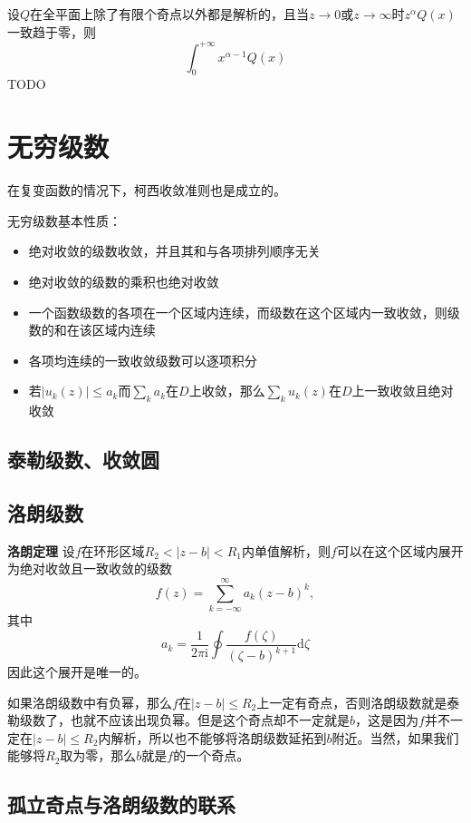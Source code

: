 \documentclass[UTF8]{ctexart}
\begin{document}
设$Q$在全平面上除了有限个奇点以外都是解析的，且当$z \to 0$或$z \to \infty$时$z^\alpha Q(x)$一致趋于零，则
\[
\int_0^{+\infty} x^{\alpha - 1} Q(x)
\] TODO

\hypertarget{ux65e0ux7a77ux7ea7ux6570}{%
\section{无穷级数}\label{ux65e0ux7a77ux7ea7ux6570}}

在复变函数的情况下，柯西收敛准则也是成立的。

无穷级数基本性质：
\begin{itemize}
    \item 绝对收敛的级数收敛，并且其和与各项排列顺序无关
    \item 绝对收敛的级数的乘积也绝对收敛
    \item 一个函数级数的各项在一个区域内连续，而级数在这个区域内一致收敛，则级数的和在该区域内连续
    \item 各项均连续的一致收敛级数可以逐项积分 
    \item 若$|u_k(z)| \leq a_k$而$\sum_k a_k$在$D$上收敛，那么$\sum_k u_k(z)$在$D$上一致收敛且绝对收敛
\end{itemize}

\hypertarget{ux6cf0ux52d2ux7ea7ux6570ux6536ux655bux5706}{%
\subsection{泰勒级数、收敛圆}\label{ux6cf0ux52d2ux7ea7ux6570ux6536ux655bux5706}}

\hypertarget{ux6d1bux6717ux7ea7ux6570}{%
\subsection{洛朗级数}\label{ux6d1bux6717ux7ea7ux6570}}

\textbf{洛朗定理}
设$f$在环形区域$R_2 < |z-b| < R_1$内单值解析，则$f$可以在这个区域内展开为绝对收敛且一致收敛的级数
\[
f(z) = \sum_{k=-\infty}^\infty a_k (z-b)^k,
\] 其中 \[
a_k = \frac{1}{2\pi \mathrm{i}} \oint \frac{f(\zeta)}{(\zeta - b)^{k+1}}\mathrm{d}\zeta
\] 因此这个展开是唯一的。

如果洛朗级数中有负幂，那么$f$在$|z-b|\leq R_2$上一定有奇点，否则洛朗级数就是泰勒级数了，也就不应该出现负幂。但是这个奇点却不一定就是$b$，这是因为$f$并不一定在$|z-b|\leq R_2$内解析，所以也不能够将洛朗级数延拓到$b$附近。当然，如果我们能够将$R_2$取为零，那么$b$就是$f$的一个奇点。

\hypertarget{ux5b64ux7acbux5947ux70b9ux4e0eux6d1bux6717ux7ea7ux6570ux7684ux8054ux7cfb}{%
\subsection{孤立奇点与洛朗级数的联系}\label{ux5b64ux7acbux5947ux70b9ux4e0eux6d1bux6717ux7ea7ux6570ux7684ux8054ux7cfb}}
\end{document}
